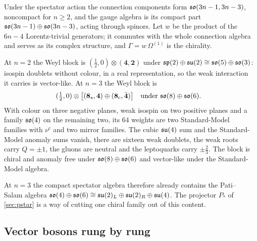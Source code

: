 Under the spectator action the connection components form $\mathfrak{so}(3n-1,3n-3)$, noncompact for $n\ge2$, and the gauge algebra is its compact part
$\mathfrak{so}(3n-1)\oplus\mathfrak{so}(3n-3)$, acting through spinors. Let $w$ be the product of the $6n-4$ Lorentz-trivial generators; it commutes with the whole
connection algebra and serves as its complex structure, and $\Gamma=w\,\Omega^{(1)}$ is the chirality.

\begin{proposition}
\label{prop:spectator}
At $n=2$ the Weyl block is $(\tfrac12,0)\otimes(\mathbf4,\mathbf2)$ under $\mathfrak{sp}(2)\oplus\mathfrak{su}(2)\cong\mathfrak{so}(5)\oplus\mathfrak{so}(3)$: isospin doublets without colour, in a
real representation, so the weak interaction it carries is vector-like. At $n=3$ the Weyl block is
\[
(\tfrac12,0)\otimes\bigl[(\mathbf8_s,\mathbf4)\oplus(\mathbf8_c,\bar{\mathbf4})\bigr]\quad\text{under }\mathfrak{so}(8)\oplus\mathfrak{so}(6) .
\]
With colour on three negative planes, weak isospin on two positive planes and a family $\mathfrak{so}(4)$ on the remaining two, its $64$ weights are two
Standard-Model families with $\nu^c$ and two mirror families. The cubic $\mathfrak{su}(4)$ sum and the Standard-Model anomaly sums vanish, there are sixteen weak
doublets, the weak roots carry $Q=\pm1$, the gluons are neutral and the leptoquarks carry $\pm\tfrac23$. The block is chiral and anomaly free under
$\mathfrak{so}(8)\oplus\mathfrak{so}(6)$ and vector-like under the Standard-Model algebra.
\end{proposition}

At $n=3$ the compact spectator algebra therefore already contains the Pati--Salam algebra $\mathfrak{so}(4)\oplus\mathfrak{so}(6)\cong\mathfrak{su}(2)_L\oplus\mathfrak{su}(2)_R\oplus\mathfrak{su}(4)$. The
projector $P_*$ of \cref{sec:pstar} is a way of cutting one chiral family out of this content.

\subsection{Vector bosons rung by rung}
\label{sec:rungs}

